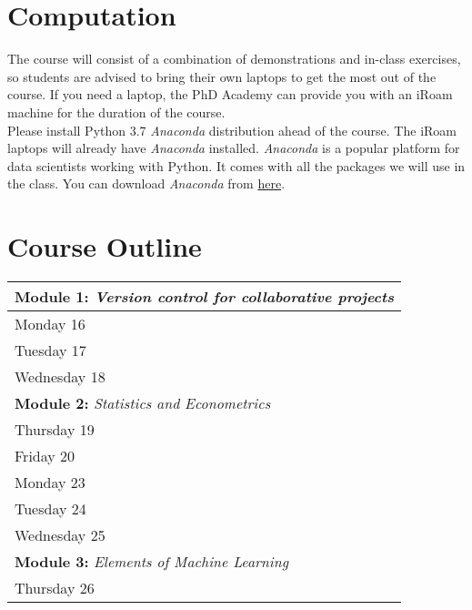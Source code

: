 \documentclass[12pt, titlepage]{article}
\begin{document}
\section*{Computation}

The course will consist of a combination of demonstrations and in-class exercises, so students are advised to bring their own laptops to get the most out of the course. If you need a laptop, the PhD Academy can provide you with an iRoam machine for the duration of the course.\\
Please install Python 3.7 \textit{Anaconda} distribution ahead of the course. The iRoam laptops will already have \textit{Anaconda} installed. \textit{Anaconda} is a popular platform for data scientists working with Python. It comes with all the packages we will use in the class. You can download \textit{Anaconda} from \href{https://www.anaconda.com/distribution/}{here}.

\section*{Course Outline}

\begin{center}
    \begin{tabular}{p{4cm} | p{10cm} }
    \hline
    \multicolumn{2}{l}{\textbf{Module 1:} \emph{Version control for collaborative projects}} \\
    \hline
       Monday 16  &  \\
       Tuesday 17  & \\
       Wednesday 18 & \\
    \hline
    \multicolumn{2}{l}{\textbf{Module 2:} \emph{Statistics and Econometrics}} \\
    \hline
    Thursday 19 & \\
    Friday 20 & \\
    Monday 23 & \\
    Tuesday 24 & \\
    Wednesday 25 & \\
    \hline
    \multicolumn{2}{l}{\textbf{Module 3:} \emph{Elements of Machine Learning}} \\
    \hline
    Thursday 26 & \\
    \hline
    \end{tabular}
\end{center}
\end{document}
